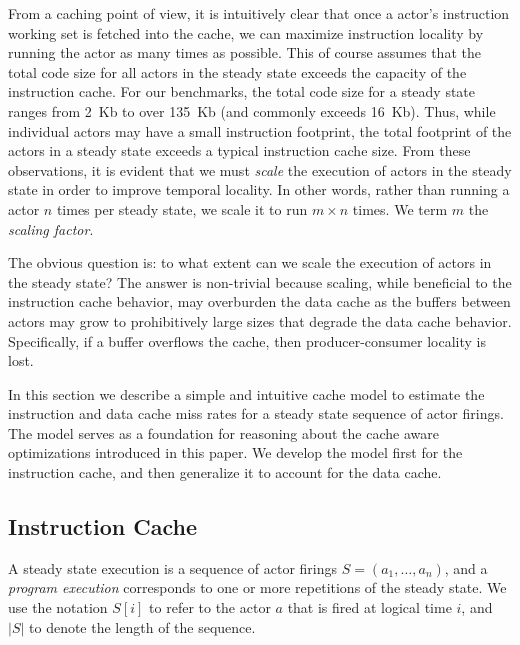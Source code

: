 \documentclass{sigplanconf}
\begin{document}
From a caching point of view, it is intuitively clear that once a
actor's instruction working set is fetched into the cache, we can
maximize instruction locality by running the actor as many times as
possible.  This of course assumes that the total code size for
all actors in the steady state exceeds the capacity of the
instruction cache.
For our benchmarks, the total code size for a steady state
ranges from 2~Kb to over 135~Kb (and commonly exceeds 16~Kb). Thus, while individual actors may have a
small instruction footprint, the total footprint of the actors in a
steady state exceeds a typical instruction cache size.
From these observations, it is evident that we must {\it scale} the
execution of actors in the steady state in order to improve temporal
locality. In other words, rather than running a actor $n$ times per
steady state, we scale it to run $m \times n$ times.
%
We term $m$ the {\it scaling factor}.

The obvious question is: to what extent can we scale the execution of
actors in the steady state? The answer is non-trivial because
scaling, while beneficial to the instruction cache behavior, may
overburden the data cache as the buffers between actors may grow to
prohibitively large sizes that degrade the data cache
behavior. Specifically, if a buffer overflows the cache, then
producer-consumer locality is lost.

In this section we describe a simple and intuitive cache model to
estimate the instruction and data cache miss rates for a steady state
sequence of actor firings. The model serves as a foundation for
reasoning about the cache aware optimizations introduced in this
paper. We develop the model first for the instruction cache, and then
generalize it to account for the data cache.

\subsection{Instruction Cache}

A steady state execution is a sequence of actor firings
$S=(a_1,\ldots, a_n)$, and a
{\it program execution} corresponds to one or more repetitions of the
steady state. We use the notation $S[i]$ to refer to the
actor $a$ that is fired at logical time $i$, and $|S|$ to
denote the length of the sequence. 
\end{document}
